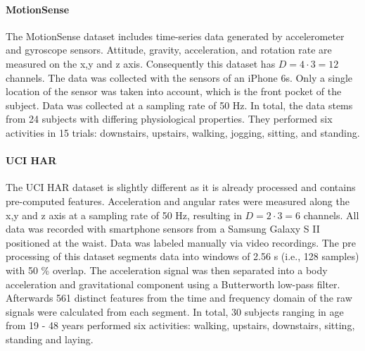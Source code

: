 \documentclass[11pt,titlepage,oneside,openany]{book}
\begin{document}
\paragraph{MotionSense}
The MotionSense dataset includes time-series data generated by accelerometer and gyroscope sensors. Attitude, gravity, acceleration, and rotation rate are measured on the x,y and z axis. Consequently this dataset has $D = 4 \cdot 3 = 12$ channels. The data was collected with the sensors of an iPhone 6s. Only a single location of the sensor was taken into account, which is the front pocket of the subject. Data was collected at a sampling rate of 50 Hz. In total, the data stems from 24 subjects with differing physiological properties. They performed six activities in 15 trials: downstairs, upstairs, walking, jogging, sitting, and standing.

\paragraph{UCI HAR}
The UCI HAR dataset is slightly different as it is already processed and contains pre-computed features. Acceleration and angular rates were measured along the x,y and z axis at a sampling rate of 50 Hz, resulting in $D = 2 \cdot 3 = 6$ channels. All data was recorded with smartphone sensors from a Samsung Galaxy S II positioned at the waist. Data was labeled manually via video recordings. The pre processing of this dataset segments data into windows of 2.56 s (i.e., 128 samples) with 50 \% overlap. The acceleration signal was then separated into a body acceleration and gravitational component using a Butterworth low-pass filter. Afterwards 561 distinct features from the time and frequency domain of the raw signals were calculated from each segment. In total, 30 subjects ranging in age from 19 - 48 years performed six activities: walking, upstairs, downstairs, sitting, standing and laying.
\end{document}
